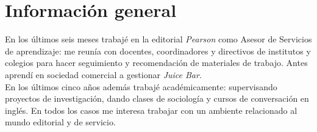 \documentclass[a4paper,hidelinks]{twentysecondcv} %
\begin{document}
\begin{twenty} %
\end{twenty}


\section{Información general}


En los últimos seis meses trabajé en la editorial \textit{Pearson} como Asesor de Servicios de aprendizaje: me reunía con docentes, coordinadores y directivos de institutos y colegios para hacer seguimiento y recomendación de materiales de trabajo. 
Antes aprendí en sociedad comercial a gestionar \textit{Juice Bar}.
\\
En los últimos cinco años además trabajé académicamente: supervisando proyectos de investigación, dando clases de sociología y cursos de conversación en inglés. En todos los casos me interesa trabajar con un ambiente relacionado al mundo editorial y de servicio.

\end{document}

